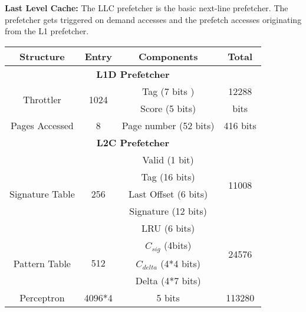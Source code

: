 \noindent \textbf{Last Level Cache:} The LLC prefetcher is the basic
next-line prefetcher. The prefetcher gets triggered on demand accesses
and the prefetch accesses originating from the L1 prefetcher.

\begin{table}[h]
\begin{adjustwidth}{}{}
    \centering
    \begin{adjustbox}{width=0.8\columnwidth}
    \begin{tabular}{|c|c|c|c|}
    \hline
        \textbf{Structure} &
        \textbf{Entry} &
        \textbf{Components} &
        \textbf{Total} \\
    \hline
	\multicolumn{4}{|c|}{\textbf{L1D Prefetcher}}	\\
    \hline
	\multirow{2}{1.5cm}{Throttler}	& 	\multirow{2}{0.7 cm}{1024} &	Tag (7 bits )	&  12288	\\
					&				   &	Score (5 bits)	&  bits		\\
    \hline
	Pages Accessed			&	8			   & 	Page number (52 bits) 	& 416 bits	\\
    \hline
	\multicolumn{4}{|c|}{\textbf{L2C Prefetcher}}	\\
    \hline
                                            &  \multirow{5}{0.5cm}{256}    & Valid (1 bit)  &             \\
                                             &      & Tag (16 bits)        &  \multirow{2}{0.9cm}{11008}           \\
                            Signature Table  &   & Last Offset (6 bits) &  \multirow{2}{0.5cm}{bits}  \\  
                                             &      & Signature (12 bits)  &             \\
                                             &      & LRU (6 bits)         &             \\
    \hline
                                    &  \multirow{3}{0.5cm}{512}    & $C_{sig}$ (4bits)      &\multirow{2}{0.9cm}{24576}               \\
                       Pattern Table         &   & $C_{delta}$ (4*4 bits) &  \multirow{2}{0.5cm}{bits}  \\
                                             &      & Delta (4*7 bits)       &               \\
    \hline
        \multirow{4}{1.5cm}{Perceptron\newline}     & 4096*4    & \multirow{4}{0.8cm}{5 bits}  & \multirow{3}{1.1cm}{113280}             \\

\end{tabular}
\end{adjustbox}
\end{adjustwidth}
\end{table}
